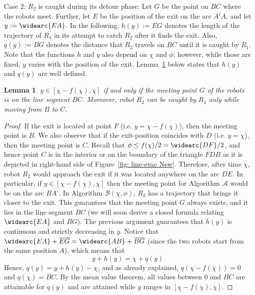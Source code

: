 \documentclass[
final
]{dmtcs-episciences}
\newcommand{\barr}[1]{\overline{#1}}
\newcommand{\RA}{\ensuremath{R_1}}
\newcommand{\RB}{\ensuremath{R_2 }}
\newcommand{\arccc}[1]{
\widearc{#1}
}
\newtheorem{lemma}[theorem]{Lemma}
\theoremstyle{definition}
\begin{document}
\begin{description}
\item{Case 2: $\RB$ is caught during its detour phase:} Let $G$ be the point on $BC$ where the robots meet. Further, let $E$ be the position of the exit on the arc $A'A$, and let $y:=\arccc{EA}$. In the following, $h(y):=\barr{EG}$ denotes the length of the trajectory of $\RA$ in its attempt to catch $\RB$ after it finds the exit. Also, $q(y):=\barr{BG}$ denotes the distance that $\RB$ travels on $BC$ until it is caught by $\RA$. Note that the functions $h$ and $q$ also depend on $\chi$ and $\phi$; however, while those are fixed, $y$ varies with the position of the exit. 
	Lemma~\ref{lem: meeting condition for line algo} below states that $h(y)$ and $q(y)$ are well defined.
\begin{lemma}\label{lem: meeting condition for line algo}
	$y \in [\chi-f(\chi), \chi]$ if and only if the meeting point $G$ of the robots is on the line segment $BC$. Moreover, robot $\RB$ can be caught by $\RA$ only while moving from $B$ to $C$. \end{lemma} 
\begin{proof}
If the exit is located at point $F$ (i.e. $y=\chi-f(\chi)$), then the meeting point is $B$. We also observe that if the exit-position coincides with $D$ (i.e. $y=\chi$), then the meeting point is $C$. 
Recall that $\phi\leq f(\chi)/2 = \arccc{DF}/2$, and hence point $C$ is in the interior or on the boundary of the triangle $FDB$ as it is depicted in right-hand side of Figure~\ref{fig: line-evac New}. Therefore, after time $\chi$, robot $\RB$ would approach the exit if it was located anywhere on the arc ${DE}$. In particular, if $y \in [\chi-f(\chi),\chi]$ then the meeting point for Algorithm $\mathcal A$ would be on the 
arc $BA'$. In Algorithm $\mathcal B(\chi, \phi)$, $\RB$ has a trajectory that brings it closer to the exit. This guarantees that the meeting point $G$ always exists, and it lies in the 
line segment $BC$ (we will soon derive a closed formula relating $\arccc{EA}$ and $\barr{BG}$). 
The previous argument guarantees that $h(y)$ is continuous and strictly decreasing in $y$.  
Notice that $\arccc{EA}+\barr{EG}=\arccc{AB}+\barr{BG}$ (since the two robots start from the same position $A$), which means that 
\begin{equation}\label{equa: meeting condition line interior trajectory}
y+h(y)=\chi+q(y)
\end{equation}
 Hence, $q(y)= y+h(y)-\chi$, and as already explained, $q(\chi-f(\chi))=0$ and $q(\chi)=\barr{BC}$. By the mean value theorem, all values between 0 and $\barr{BC}$ are attainable for $q(y)$ and are attained while $y$ ranges in $[\chi-f(\chi), \chi]$. \hfill 
\end{proof}


\end{description}
\end{document}

